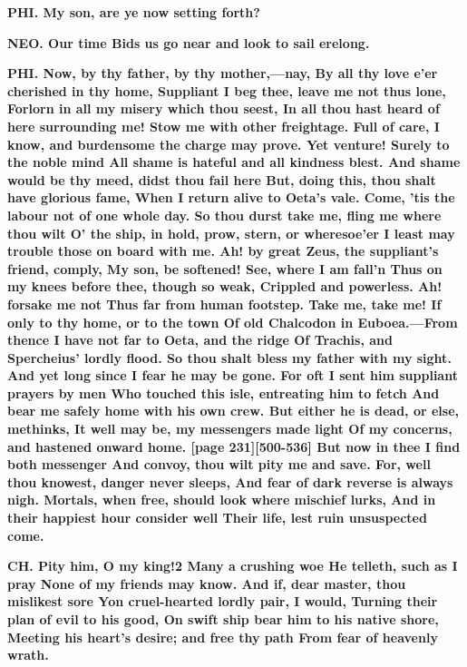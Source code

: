 \documentclass[11pt,letter]{book}
\begin{document}
\par \textbf{PHI. My son, are ye now setting forth?}
\par 

\par \textbf{NEO. Our time Bids us go near and look to sail erelong.}
\par 

\par \textbf{PHI. Now, by thy father, by thy mother,—nay, By all thy love e’er cherished in thy home, Suppliant I beg thee, leave me not thus lone, Forlorn in all my misery which thou seest, In all thou hast heard of here surrounding me! Stow me with other freightage. Full of care, I know, and burdensome the charge may prove. Yet venture! Surely to the noble mind All shame is hateful and all kindness blest. And shame would be thy meed, didst thou fail here But, doing this, thou shalt have glorious fame, When I return alive to Oeta’s vale. Come, ’tis the labour not of one whole day. So thou durst take me, fling me where thou wilt O’ the ship, in hold, prow, stern, or wheresoe’er I least may trouble those on board with me. Ah! by great Zeus, the suppliant’s friend, comply, My son, be softened! See, where I am fall’n Thus on my knees before thee, though so weak, Crippled and powerless. Ah! forsake me not Thus far from human footstep. Take me, take me! If only to thy home, or to the town Of old Chalcodon in Euboea.—From thence I have not far to Oeta, and the ridge Of Trachis, and Spercheius’ lordly flood. So thou shalt bless my father with my sight. And yet long since I fear he may be gone. For oft I sent him suppliant prayers by men Who touched this isle, entreating him to fetch And bear me safely home with his own crew. But either he is dead, or else, methinks, It well may be, my messengers made light Of my concerns, and hastened onward home. [page 231][500-536] But now in thee I find both messenger And convoy, thou wilt pity me and save. For, well thou knowest, danger never sleeps, And fear of dark reverse is always nigh. Mortals, when free, should look where mischief lurks, And in their happiest hour consider well Their life, lest ruin unsuspected come.}
\par 

\par \textbf{CH. Pity him, O my king!2 Many a crushing woe He telleth, such as I pray None of my friends may know. And if, dear master, thou mislikest sore Yon cruel-hearted lordly pair, I would, Turning their plan of evil to his good, On swift ship bear him to his native shore, Meeting his heart’s desire; and free thy path From fear of heavenly wrath.}
\par 
\end{document}
